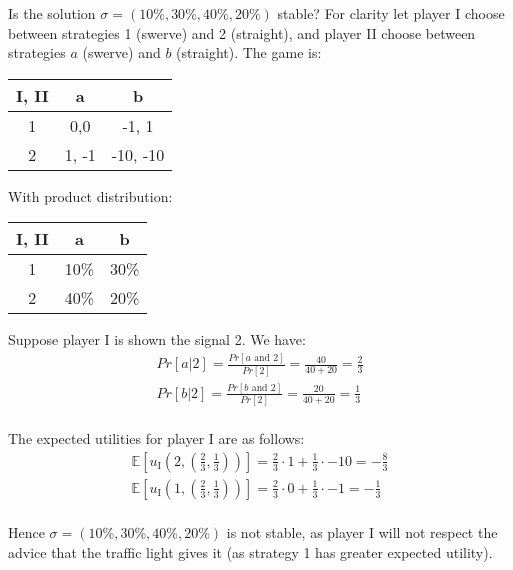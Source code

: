 		Is the solution $\sigma = (10\%, 30\%, 40\%, 20\%)$ stable? For clarity
		let player I choose between strategies 1 (swerve) and 2 (straight), and
		player II choose between strategies $a$ (swerve) and $b$ (straight).
		The game is:
		\begin{center}
			\begin{tabular}{|c|c|c|}
				\hline
				\textbf{I, II} & a     & b \\ \hline
				1              & 0,0   & -1, 1 \\ \hline
				2              & 1, -1 & -10, -10 \\ \hline
			\end{tabular}
		\end{center}

		With product distribution:
		\begin{center}
			\begin{tabular}{|c|c|c|}
				\hline
				\textbf{I, II} & a    & b \\ \hline
				1              & 10\% & 30\% \\ \hline
				2              & 40\% & 20\% \\ \hline
			\end{tabular}
		\end{center}

		Suppose player I is shown the signal 2. We have:
		\begin{equation*}
			\begin{split}
				Pr[a|2] = \frac{Pr[a \text{ and } 2]}{Pr[2]} = \frac{40}{40+20}
				= \frac{2}{3} \\
				Pr[b|2] = \frac{Pr[b \text{ and } 2]}{Pr[2]} = \frac{20}{40+20}
				= \frac{1}{3} \\
			\end{split}
		\end{equation*}

		The expected utilities for player I are as follows:
		\begin{equation*}
			\begin{split}
				\mathbb{E}[u_\text{I}(2, (\frac{2}{3}, \frac{1}{3}))] =
				\frac{2}{3} \cdot 1 + \frac{1}{3} \cdot -10 = -\frac{8}{3} \\
				\mathbb{E}[u_\text{I}(1, (\frac{2}{3}, \frac{1}{3}))] =
				\frac{2}{3} \cdot 0 + \frac{1}{3} \cdot -1 = -\frac{1}{3} \\
			\end{split}
		\end{equation*}
		
		Hence $\sigma = (10\%, 30\%, 40\%, 20\%)$ is not stable, as player I
		will not respect the advice that the traffic light gives it (as
		strategy 1 has greater expected utility).

